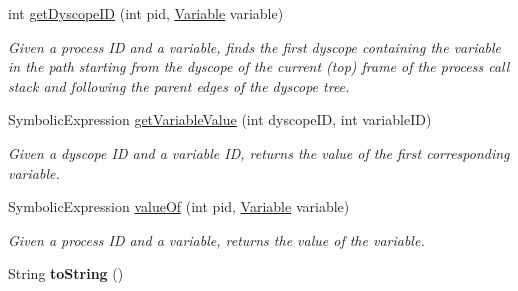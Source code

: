 \begin{DoxyCompactItemize}
int \hyperlink{interfaceedu_1_1udel_1_1cis_1_1vsl_1_1civl_1_1state_1_1IF_1_1State_a20214baa72ceeeef8c7a81915d853bf7}{get\+Dyscope\+I\+D} (int pid, \hyperlink{interfaceedu_1_1udel_1_1cis_1_1vsl_1_1civl_1_1model_1_1IF_1_1variable_1_1Variable}{Variable} variable)
\begin{DoxyCompactList}\small\item\em Given a process I\+D and a variable, finds the first dyscope containing the variable in the path starting from the dyscope of the current (top) frame of the process call stack and following the parent edges of the dyscope tree. \end{DoxyCompactList}\item 
Symbolic\+Expression \hyperlink{interfaceedu_1_1udel_1_1cis_1_1vsl_1_1civl_1_1state_1_1IF_1_1State_a193f399ccb91de6987f22a45cc47e3b1}{get\+Variable\+Value} (int dyscope\+I\+D, int variable\+I\+D)
\begin{DoxyCompactList}\small\item\em Given a dyscope I\+D and a variable I\+D, returns the value of the first corresponding variable. \end{DoxyCompactList}\item 
Symbolic\+Expression \hyperlink{interfaceedu_1_1udel_1_1cis_1_1vsl_1_1civl_1_1state_1_1IF_1_1State_a3c06a06f45da30805c784fd5c1b20985}{value\+Of} (int pid, \hyperlink{interfaceedu_1_1udel_1_1cis_1_1vsl_1_1civl_1_1model_1_1IF_1_1variable_1_1Variable}{Variable} variable)
\begin{DoxyCompactList}\small\item\em Given a process I\+D and a variable, returns the value of the variable. \end{DoxyCompactList}\item 
\hypertarget{interfaceedu_1_1udel_1_1cis_1_1vsl_1_1civl_1_1state_1_1IF_1_1State_aceeec9fc0f1f54fd1829869afa967ade}{}String {\bfseries to\+String} ()\label{interfaceedu_1_1udel_1_1cis_1_1vsl_1_1civl_1_1state_1_1IF_1_1State_aceeec9fc0f1f54fd1829869afa967ade}


\end{DoxyCompactItemize}
